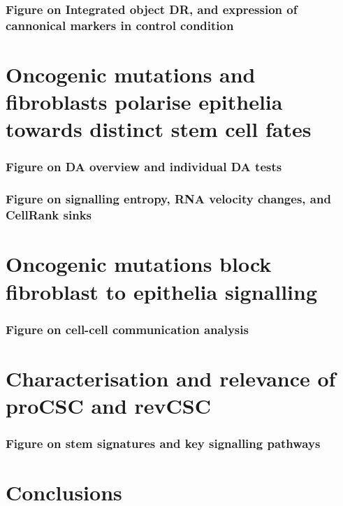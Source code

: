 \subsubsection{Figure on Integrated object DR, and expression of cannonical markers in control condition}

\section{Oncogenic mutations and fibroblasts polarise epithelia towards distinct stem cell fates}

\subsubsection{Figure on DA overview and individual DA tests}

\subsubsection{Figure on signalling entropy, RNA velocity changes, and CellRank sinks}

\section{Oncogenic mutations block fibroblast to epithelia signalling}

\subsubsection{Figure on cell-cell communication analysis}

\section{Characterisation and relevance of proCSC and revCSC}

\subsubsection{Figure on stem signatures and key signalling pathways}

\section{Conclusions}





